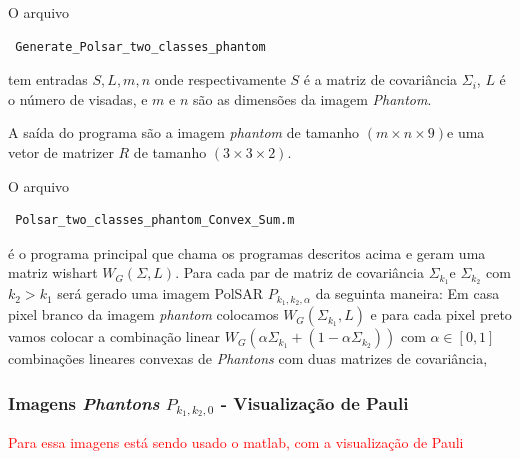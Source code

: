 \documentclass[12pt,a4paper]{article}
\begin{document}
O arquivo \begin{verbatim} Generate_Polsar_two_classes_phantom \end{verbatim} tem entradas $S, L, m, n$ onde respectivamente $S$ é a matriz de covariância $\Sigma_i$, $L$ é o número de visadas, e $m$ e $n$ são as dimensões da imagem {\it Phantom}.   

A saída do programa são a imagem {\it phantom} de tamanho $(m\times n \times 9)$e uma vetor de matrizer $R$ de tamanho $(3 \times 3 \times 2)$.


O arquivo \begin{verbatim} Polsar_two_classes_phantom_Convex_Sum.m \end{verbatim} é o programa principal que chama os programas descritos acima e geram uma matriz wishart $W_G(\Sigma,L)$. Para cada par de matriz de covariância $\Sigma_{k_1}$e $\Sigma_{k_2}$ com $k_2>k_1$ será gerado uma imagem PolSAR $P_{k_1,k_2,\alpha}$ da seguinta maneira: Em casa pixel branco da imagem {\it phantom} colocamos $W_G(\Sigma_{k_1},L)$ e para cada pixel preto vamos colocar a combinação linear $W_G(\alpha\Sigma_{k_1}+(1-\alpha\Sigma_{k_2}))$ com $\alpha\in[0,1]$ combinações lineares convexas de {\it Phantons} com duas matrizes de covariância,  
 
\subsubsection{Imagens  {\it Phantons} $P_{k_1,k_2,0}$ - Visualização de Pauli} 


\textcolor{red}{Para essa imagens está sendo usado o matlab, com a visualização de Pauli}
\end{document}

